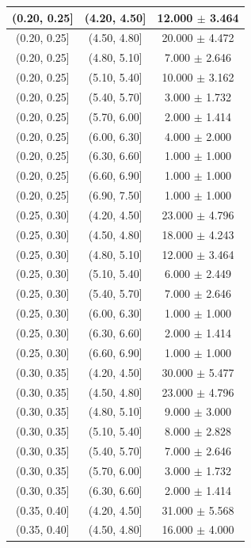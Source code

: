 \begin{longtable}{|c|c|c|}
\hline
(0.20, 0.25] & (4.20, 4.50] & 12.000 $\pm$ 3.464 \\ 
\hline
(0.20, 0.25] & (4.50, 4.80] & 20.000 $\pm$ 4.472 \\ 
\hline
(0.20, 0.25] & (4.80, 5.10] & 7.000 $\pm$ 2.646 \\ 
\hline
(0.20, 0.25] & (5.10, 5.40] & 10.000 $\pm$ 3.162 \\ 
\hline
(0.20, 0.25] & (5.40, 5.70] & 3.000 $\pm$ 1.732 \\ 
\hline
(0.20, 0.25] & (5.70, 6.00] & 2.000 $\pm$ 1.414 \\ 
\hline
(0.20, 0.25] & (6.00, 6.30] & 4.000 $\pm$ 2.000 \\ 
\hline
(0.20, 0.25] & (6.30, 6.60] & 1.000 $\pm$ 1.000 \\ 
\hline
(0.20, 0.25] & (6.60, 6.90] & 1.000 $\pm$ 1.000 \\ 
\hline
(0.20, 0.25] & (6.90, 7.50] & 1.000 $\pm$ 1.000 \\ 
\hline
(0.25, 0.30] & (4.20, 4.50] & 23.000 $\pm$ 4.796 \\ 
\hline
(0.25, 0.30] & (4.50, 4.80] & 18.000 $\pm$ 4.243 \\ 
\hline
(0.25, 0.30] & (4.80, 5.10] & 12.000 $\pm$ 3.464 \\ 
\hline
(0.25, 0.30] & (5.10, 5.40] & 6.000 $\pm$ 2.449 \\ 
\hline
(0.25, 0.30] & (5.40, 5.70] & 7.000 $\pm$ 2.646 \\ 
\hline
(0.25, 0.30] & (6.00, 6.30] & 1.000 $\pm$ 1.000 \\ 
\hline
(0.25, 0.30] & (6.30, 6.60] & 2.000 $\pm$ 1.414 \\ 
\hline
(0.25, 0.30] & (6.60, 6.90] & 1.000 $\pm$ 1.000 \\ 
\hline
(0.30, 0.35] & (4.20, 4.50] & 30.000 $\pm$ 5.477 \\ 
\hline
(0.30, 0.35] & (4.50, 4.80] & 23.000 $\pm$ 4.796 \\ 
\hline
(0.30, 0.35] & (4.80, 5.10] & 9.000 $\pm$ 3.000 \\ 
\hline
(0.30, 0.35] & (5.10, 5.40] & 8.000 $\pm$ 2.828 \\ 
\hline
(0.30, 0.35] & (5.40, 5.70] & 7.000 $\pm$ 2.646 \\ 
\hline
(0.30, 0.35] & (5.70, 6.00] & 3.000 $\pm$ 1.732 \\ 
\hline
(0.30, 0.35] & (6.30, 6.60] & 2.000 $\pm$ 1.414 \\ 
\hline
(0.35, 0.40] & (4.20, 4.50] & 31.000 $\pm$ 5.568 \\ 
\hline
(0.35, 0.40] & (4.50, 4.80] & 16.000 $\pm$ 4.000 \\ 

\end{longtable}
